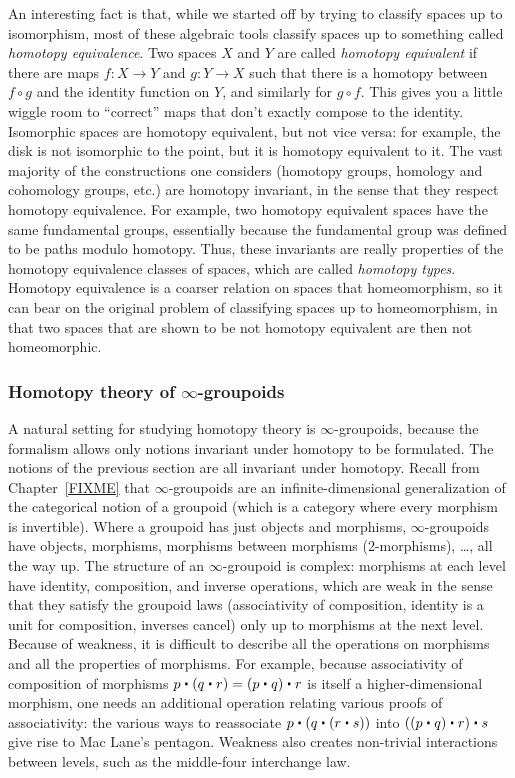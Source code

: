 An interesting fact is that, while we started off by trying to classify
spaces up to isomorphism, most of these algebraic tools classify
spaces up to something called \emph{homotopy equivalence}.  Two spaces $X$ and $Y$
are called {\em homotopy equivalent} if there are maps $f : X \rightarrow Y$ and $g : Y \rightarrow X$
such that there is a homotopy between $f \circ g$ and the identity function on $Y$,
and similarly for $g \circ f$.  This gives you a little wiggle room to
``correct'' maps that don't exactly compose to the identity.
Isomorphic spaces are homotopy
equivalent, but not vice versa: for example, the disk is not isomorphic
to the point, but it is homotopy equivalent to it.  The vast majority of
the constructions one considers (homotopy groups, homology and
cohomology groups, etc.) are homotopy invariant, in the sense that they
respect homotopy equivalence.  For example, two homotopy equivalent
spaces have the same fundamental groups, essentially because the
fundamental group was defined to be paths modulo homotopy.  Thus, these
invariants are really properties of the homotopy equivalence classes of
spaces, which are called \emph{homotopy types}.  Homotopy equivalence is a coarser
relation on spaces that homeomorphism, so it can bear 
                                                         on the original
problem of classifying spaces up to homeomorphism, in that two spaces
that are shown to be not homotopy equivalent are then not homeomorphic.

\subsubsection{Homotopy theory of $\infty$-groupoids}

A natural setting for studying homotopy theory is $\infty$-groupoids, because
the formalism allows only notions invariant under homotopy to be formulated.
The notions of the previous section are all invariant under homotopy.
                                       Recall from Chapter~\ref{FIXME}
that $\infty$-groupoids are an infinite-dimensional generalization of
the categorical notion of a groupoid (which is a category where every
morphism is invertible).  Where a groupoid has just objects and
morphisms, $\infty$-groupoids have objects, morphisms, morphisms between
morphisms (2-morphisms), \dots, all the way up.  The structure of an $\infty$-groupoid is
complex: morphisms at each level have identity, composition,
and inverse operations, which are weak in the sense that they satisfy
the groupoid laws (associativity of composition, identity is a unit for
composition, inverses cancel) only up to morphisms at the next level.
Because of weakness, it is difficult to describe all the
operations on morphisms and all the properties of morphisms.  For example, because associativity
of composition of morphisms $p \ct (q \ct r) = (p \ct q) \ct r$ is
itself a higher-dimensional morphism, one needs an additional operation
relating various proofs of associativity: the various
ways to reassociate $p \ct (q \ct (r \ct s))$ into $((p \ct q) \ct r)
\ct s$ give rise to Mac Lane's pentagon.  Weakness also creates
non-trivial interactions between levels, such as the middle-four
interchange law.

